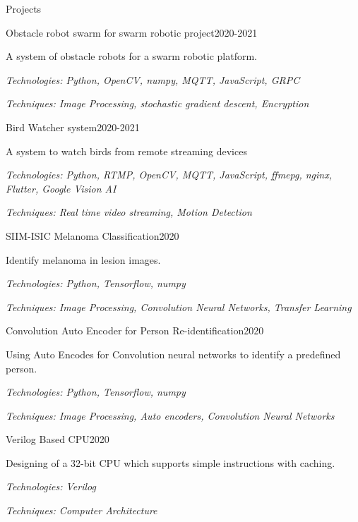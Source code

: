 \documentclass{resume} %
\begin{document}

\begin{rSection}{Projects}

\begin{rSubsection}{Obstacle robot swarm for swarm robotic project}{2020-2021}{}{}
\item A system of obstacle robots for a swarm robotic platform. \item 
\textit{Technologies: Python, OpenCV, numpy, MQTT, JavaScript, GRPC}
\item \textit{Techniques: Image Processing, stochastic gradient descent, Encryption }
\end{rSubsection}

\begin{rSubsection}{Bird Watcher system}{2020-2021}{}{}
\item A system to watch birds from remote streaming devices \item 
\textit{Technologies: Python, RTMP, OpenCV, MQTT, JavaScript, ffmepg, nginx, Flutter, Google Vision AI}
\item \textit{Techniques: Real time video streaming, Motion Detection}
\end{rSubsection}

\begin{rSubsection}{SIIM-ISIC Melanoma Classification}{2020}{}{}
\item Identify melanoma in lesion images. \item 
\textit{Technologies: Python, Tensorflow, numpy}
\item \textit{Techniques: Image Processing, Convolution Neural Networks, Transfer Learning }
\end{rSubsection}



\begin{rSubsection}{Convolution Auto Encoder for Person Re-identification}{2020}{}{}
\item Using Auto Encodes for Convolution neural networks to identify a predefined person. \item 
\textit{Technologies: Python, Tensorflow, numpy}
\item \textit{Techniques: Image Processing, Auto encoders, Convolution Neural Networks}
\end{rSubsection}


\begin{rSubsection}{Verilog Based CPU}{2020}{}{}
\item Designing of a 32-bit CPU which supports simple instructions with caching. \item 
\textit{Technologies: Verilog}
\item \textit{Techniques: Computer Architecture }
\end{rSubsection}



\end{rSection}
\end{document}
